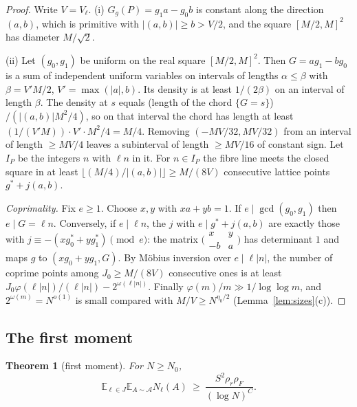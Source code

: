 \documentclass[11pt]{amsart}
\newtheorem{theorem}{Theorem}[section]
\theoremstyle{definition}
\newcommand{\cA}{\mathcal{A}}
\newcommand{\rr}{\rho_r}
\newcommand{\rF}{\rho_F}
\newcommand{\Ex}{\mathbb{E}}
\begin{document}
\begin{proof}
Write $V=V_\ell$. (i) $G_g(P)=g_1a-g_0b$ is constant along the direction $(a,b)$, which is primitive with
$|(a,b)|\ge b>V/2$, and the square $[M/2,M]^2$ has diameter $M/\sqrt2$.

(ii) Let $(g_0,g_1)$ be uniform on the real square $[M/2,M]^2$. Then $G=ag_1-bg_0$ is a sum of independent uniform
variables on intervals of lengths $\alpha\le\beta$ with $\beta=V'M/2$, $V'=\max(|a|,b)$. Its density is at least $1/(2\beta)$ on an
interval of length $\beta$. The density at $s$ equals (length of the chord $\{G=s\}$)$/(|(a,b)|M^2/4)$, so on that interval the
chord has length at least $(1/(V'M))\cdot V'\cdot M^2/4=M/4$. Removing $(-MV/32,MV/32)$ from an interval of length $\ge MV/4$
leaves a subinterval of length $\ge MV/16$ of constant sign. Let $I_P$ be the integers $n$ with $\ell n$ in it. For $n\in I_P$
the fibre line meets the closed square in at least $\lfloor(M/4)/|(a,b)|\rfloor\ge M/(8V)$ consecutive lattice points
$g^*+j(a,b)$.

\emph{Coprimality.} Fix $e\ge1$. Choose $x,y$ with $xa+yb=1$. If $e\mid\gcd(g_0,g_1)$ then $e\mid G=\ell n$. Conversely, if $e\mid\ell n$,
the $j$ with $e\mid g^*+j(a,b)$ are exactly those with $j\equiv-(xg_0^*+yg_1^*)\pmod e$: the matrix
$\bigl(\begin{smallmatrix}x&y\\-b&a\end{smallmatrix}\bigr)$ has determinant $1$ and maps $g$ to $(xg_0+yg_1,G)$. By M\"obius
inversion over $e\mid\ell|n|$, the number of coprime points among $J_0\ge M/(8V)$ consecutive ones is at least
$J_0\varphi(\ell|n|)/(\ell|n|)-2^{\omega(\ell|n|)}$. Finally $\varphi(m)/m\gg1/\log\log m$, and $2^{\omega(m)}=N^{o(1)}$ is small
compared with $M/V\ge N^{\eta_0/2}$ (Lemma~\ref{lem:sizes}(c)).
\end{proof}

\subsection{The first moment}

\begin{theorem}[first moment]\label{thm:FM}
For $N\ge N_0$,
\[
\Ex_{\ell\in J}\Ex_{A\sim\cA}N_\ell(A)\ \ge\ \frac{S^2\rr\rF}{(\log N)^{C}}.
\]
\end{theorem}
\end{document}
